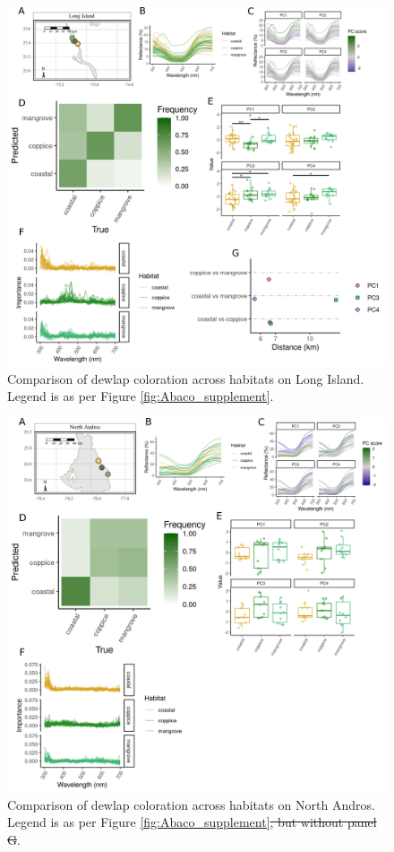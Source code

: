 \pagebreak

\begin{figure}[H]
	\centering
	\includegraphics[width=\textwidth]{figures/LongIsland_supplement.png}
	\caption{Comparison of dewlap coloration across habitats on Long Island. Legend is as per Figure \ref{fig:Abaco_supplement}.}
	\label{fig:LongIsland}
\end{figure}

\pagebreak

\begin{figure}[H]
	\centering
	\includegraphics[width=\textwidth]{figures/NorthAndros_supplement.png}
	\caption{Comparison of dewlap coloration across habitats on North Andros. Legend is as per Figure \ref{fig:Abaco_supplement}\sout{, but without panel G}.}
	\label{fig:NorthAndros}
\end{figure}


